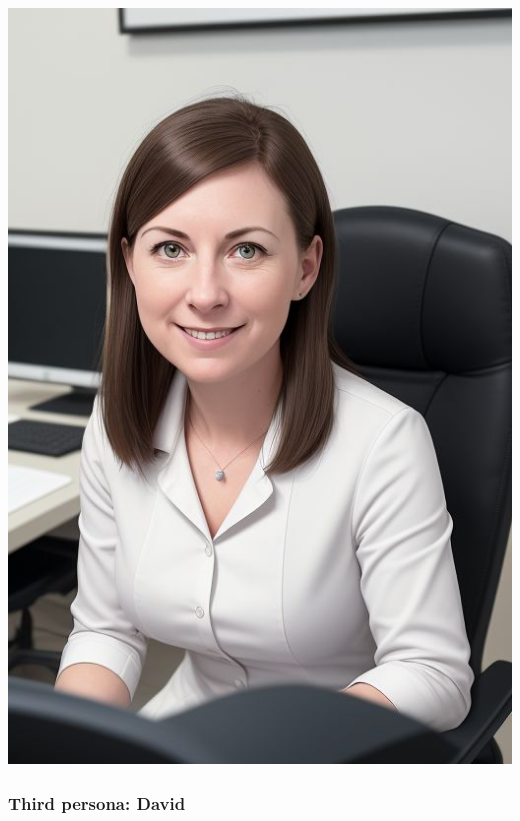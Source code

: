 \begin{minipage}[t]{0.3\textwidth} %
	\vspace{0pt} %
	\centering
	\vspace{0pt}
	\includegraphics[width=\textwidth]{../Draw.io diagrams/emily.jpeg}
\end{minipage}%
\subsubsection{Third persona: David}

